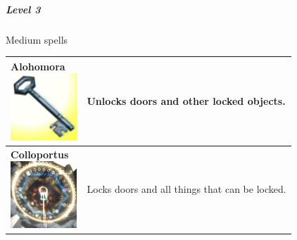 \subparagraph{Level 3}                                                                                                                        
Medium spells \\                                                                                                                              
\begin{tabular}{ p{3cm}p{14cm} } \hline  
	\specialcell[p]{\textbf{Alohomora}         \\ \includegraphics[width=2.5cm]{../Pictures/Gameplay/Spells/Icon/Alohomora_spell_icon.png}}         & Unlocks doors and other locked objects. \\ \hline  
	\specialcell[p]{\textbf{Colloportus}         \\ \includegraphics[width=2.5cm]{../Pictures/Gameplay/Spells/Icon/Colloportus_spell_icon.png}}         & Locks doors and all things that can be locked. \\ \hline                                                                                             
\end{tabular}                                                                                                                                 

